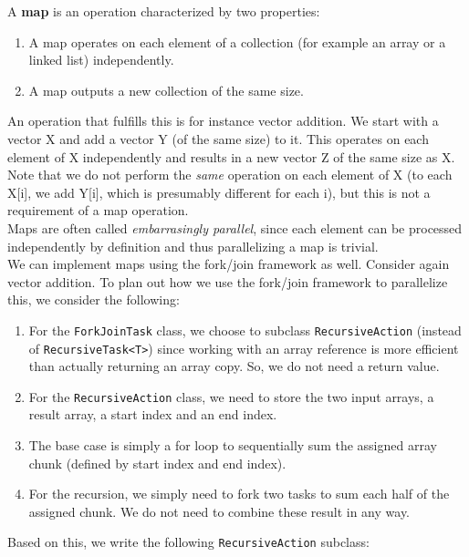 \documentclass[main.tex]{subfiles}
\begin{document}
A \textbf{map} is an operation characterized by two properties:

\begin{enumerate}
  \item A map operates on each element of a collection (for example an array or a linked list) independently.
  \item A map outputs a new collection of the same size.
\end{enumerate}

\noindent An operation that fulfills this is for instance vector addition. We start with a vector X and add a vector Y (of the same size) to it. This operates on each element of X independently and results in a new vector Z of the same size as X. Note that we do not perform the \textit{same} operation on each element of X (to each X[i], we add Y[i], which is presumably different for each i), but this is not a requirement of a map operation.\\
Maps are often called \textit{embarrasingly parallel}, since each element can be processed independently by definition and thus parallelizing a map is trivial.\\
We can implement maps using the fork/join framework as well. Consider again vector addition. To plan out how we use the fork/join framework to parallelize this, we consider the following:

\begin{enumerate}
  \item For the \texttt{ForkJoinTask} class, we choose to subclass \texttt{RecursiveAction} (instead of \texttt{RecursiveTask<T>}) since working with an array reference is more efficient than actually returning an array copy. So, we do not need a return value.
  \item For the \texttt{RecursiveAction} class, we need to store the two input arrays, a result array, a start index and an end index.
  \item The base case is simply a for loop to sequentially sum the assigned array chunk (defined by start index and end index).
  \item For the recursion, we simply need to fork two tasks to sum each half of the assigned chunk. We do not need to combine these result in any way.
\end{enumerate}

\noindent Based on this, we write the following \texttt{RecursiveAction} subclass:
\end{document}
